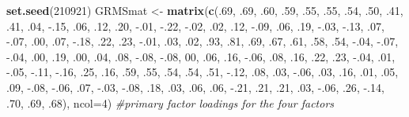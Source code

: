 \documentclass[
  english,
]{book}
\newenvironment{Shaded}{\begin{snugshade}}{\end{snugshade}}
\newcommand{\CommentTok}[1]{\textcolor[rgb]{0.56,0.35,0.01}{\textit{#1}}}
\newcommand{\DataTypeTok}[1]{\textcolor[rgb]{0.13,0.29,0.53}{#1}}
\newcommand{\DecValTok}[1]{\textcolor[rgb]{0.00,0.00,0.81}{#1}}
\newcommand{\FloatTok}[1]{\textcolor[rgb]{0.00,0.00,0.81}{#1}}
\newcommand{\KeywordTok}[1]{\textcolor[rgb]{0.13,0.29,0.53}{\textbf{#1}}}
\newcommand{\NormalTok}[1]{#1}
\newcommand{\StringTok}[1]{\textcolor[rgb]{0.31,0.60,0.02}{#1}}
\begin{document}
\begin{Shaded}
\begin{Highlighting}[]
\KeywordTok{set.seed}\NormalTok{(}\DecValTok{210921}\NormalTok{)}
\NormalTok{GRMSmat <-}\StringTok{ }\KeywordTok{matrix}\NormalTok{(}\KeywordTok{c}\NormalTok{(.}\DecValTok{69}\NormalTok{, }\FloatTok{.69}\NormalTok{, }\FloatTok{.60}\NormalTok{, }\FloatTok{.59}\NormalTok{, }\FloatTok{.55}\NormalTok{, }\FloatTok{.55}\NormalTok{, }\FloatTok{.54}\NormalTok{, }\FloatTok{.50}\NormalTok{, }\FloatTok{.41}\NormalTok{, }\FloatTok{.41}\NormalTok{, }\FloatTok{.04}\NormalTok{, }\FloatTok{-.15}\NormalTok{, }\FloatTok{.06}\NormalTok{, }\FloatTok{.12}\NormalTok{, }\FloatTok{.20}\NormalTok{, }\FloatTok{-.01}\NormalTok{, }\FloatTok{-.22}\NormalTok{, }\FloatTok{-.02}\NormalTok{, }\FloatTok{.02}\NormalTok{, }\FloatTok{.12}\NormalTok{, }\FloatTok{-.09}\NormalTok{, }\FloatTok{.06}\NormalTok{, }\FloatTok{.19}\NormalTok{, }\FloatTok{-.03}\NormalTok{, }\FloatTok{-.13}\NormalTok{,}
                  \FloatTok{.07}\NormalTok{, }\FloatTok{-.07}\NormalTok{, }\FloatTok{.00}\NormalTok{, }\FloatTok{.07}\NormalTok{, }\FloatTok{-.18}\NormalTok{, }\FloatTok{.22}\NormalTok{, }\FloatTok{.23}\NormalTok{, }\FloatTok{-.01}\NormalTok{, }\FloatTok{.03}\NormalTok{, }\FloatTok{.02}\NormalTok{, }\FloatTok{.93}\NormalTok{, }\FloatTok{.81}\NormalTok{, }\FloatTok{.69}\NormalTok{, }\FloatTok{.67}\NormalTok{, }\FloatTok{.61}\NormalTok{, }\FloatTok{.58}\NormalTok{, }\FloatTok{.54}\NormalTok{, }\FloatTok{-.04}\NormalTok{, }\FloatTok{-.07}\NormalTok{, }\FloatTok{-.04}\NormalTok{, }\FloatTok{.00}\NormalTok{, }\FloatTok{.19}\NormalTok{, }\FloatTok{.00}\NormalTok{, }\FloatTok{.04}\NormalTok{, }\FloatTok{.08}\NormalTok{,}
                  \FloatTok{-.08}\NormalTok{, }\FloatTok{-.08}\NormalTok{, }\DecValTok{00}\NormalTok{, }\FloatTok{.06}\NormalTok{, }\FloatTok{.16}\NormalTok{, }\FloatTok{-.06}\NormalTok{, }\FloatTok{.08}\NormalTok{, }\FloatTok{.16}\NormalTok{, }\FloatTok{.22}\NormalTok{, }\FloatTok{.23}\NormalTok{, }\FloatTok{-.04}\NormalTok{, }\FloatTok{.01}\NormalTok{, }\FloatTok{-.05}\NormalTok{, }\FloatTok{-.11}\NormalTok{, }\FloatTok{-.16}\NormalTok{, }\FloatTok{.25}\NormalTok{, }\FloatTok{.16}\NormalTok{, }\FloatTok{.59}\NormalTok{, }\FloatTok{.55}\NormalTok{, }\FloatTok{.54}\NormalTok{, }\FloatTok{.54}\NormalTok{, }\FloatTok{.51}\NormalTok{, }\FloatTok{-.12}\NormalTok{, }\FloatTok{.08}\NormalTok{, }\FloatTok{.03}\NormalTok{,}
                  \FloatTok{-.06}\NormalTok{, }\FloatTok{.03}\NormalTok{, }\FloatTok{.16}\NormalTok{, }\FloatTok{.01}\NormalTok{, }\FloatTok{.05}\NormalTok{, }\FloatTok{.09}\NormalTok{, }\FloatTok{-.08}\NormalTok{, }\FloatTok{-.06}\NormalTok{, }\FloatTok{.07}\NormalTok{, }\FloatTok{-.03}\NormalTok{, }\FloatTok{-.08}\NormalTok{, }\FloatTok{.18}\NormalTok{, }\FloatTok{.03}\NormalTok{, }\FloatTok{.06}\NormalTok{, }\FloatTok{.06}\NormalTok{, }\FloatTok{-.21}\NormalTok{, }\FloatTok{.21}\NormalTok{, }\FloatTok{.21}\NormalTok{, }\FloatTok{.03}\NormalTok{, }\FloatTok{-.06}\NormalTok{, }\FloatTok{.26}\NormalTok{, }\FloatTok{-.14}\NormalTok{, }\FloatTok{.70}\NormalTok{, }\FloatTok{.69}\NormalTok{, }\FloatTok{.68}\NormalTok{), }\DataTypeTok{ncol=}\DecValTok{4}\NormalTok{) }\CommentTok{#primary factor loadings for the four factors}

\end{Highlighting}
\end{Shaded}
\end{document}
